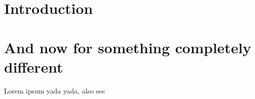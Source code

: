 \documentclass{article}
\begin{document}
\section{Introduction}

\section{And now for something completely different}
Lorem ipsum yada yada,
also see \cite{bower16}



\end{document}

